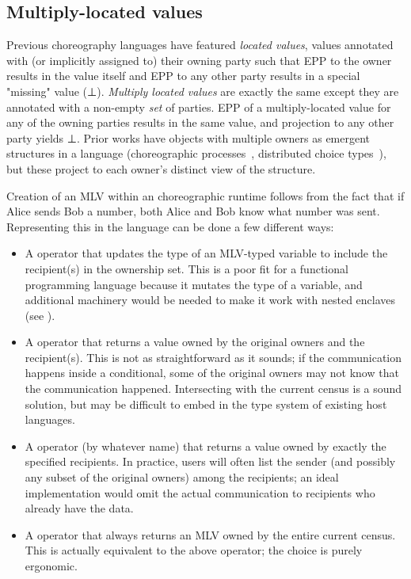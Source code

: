 \subsection{Multiply-located values}\label{sec:mlvs}
Previous choreography languages have featured \emph{located values},
values annotated with (or implicitly assigned to) their owning party such that EPP to the owner results
in the value itself and EPP to any other party results in a special
"missing" value (\eg ⊥).
\emph{Multiply located values} are exactly the same except they are annotated with a non-empty \emph{set} of parties.
EPP of a multiply-located value for any of the owning parties results in the same value,
and projection to any other party yields ⊥.
Prior works have objects with multiple owners as emergent structures in a language
(\eg choreographic processes~\cite{choral}, distributed choice types~\cite{chor-lambda-2}),
but these project to each owner's distinct view of the structure.

Creation of an MLV within an choreographic runtime follows from the fact that
if Alice sends Bob a number, both Alice and Bob know what number was sent.
Representing this in the language can be done a few different ways:
\begin{itemize}
  \item A  operator that updates the type of an MLV-typed variable to include the recipient(s) in the ownership set.
        This is a poor fit for a functional programming language because it mutates the type of a variable,
        and additional machinery would be needed to make it work with nested enclaves (see ).
  \item A  operator that returns a value owned by the original owners and the recipient(s).
        This is not as straightforward as it sounds; if the communication happens inside a conditional,
        some of the original owners may not know that the communication happened.
        Intersecting with the current census is a sound solution,
        but may be difficult to embed in the type system of existing host languages.
  \item A  operator (by whatever name) that returns a value owned by exactly the specified recipients.
        In practice, users will often list the sender (and possibly any subset of the original owners) among the recipients;
        an ideal implementation would omit the actual communication to recipients who already have the data.
  \item A  operator that always returns an MLV owned by the entire current census.
        This is actually equivalent to the above  operator; the choice is purely ergonomic.
\end{itemize}

